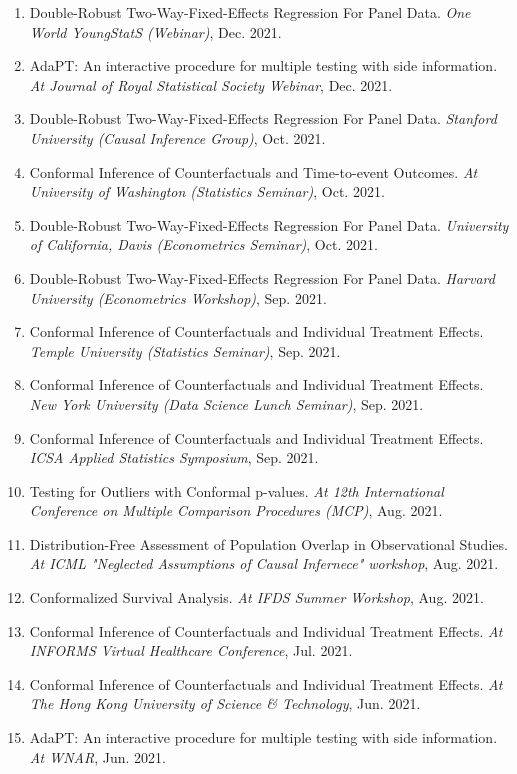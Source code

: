 \documentclass{article}
\begin{document}
\begin{enumerate}
\item Double-Robust Two-Way-Fixed-Effects Regression For Panel Data. \emph{One World YoungStatS (Webinar)}, Dec. 2021.
\item AdaPT: An interactive procedure for multiple testing with side information. \emph{At Journal of Royal Statistical Society Webinar}, Dec. 2021.
\item Double-Robust Two-Way-Fixed-Effects Regression For Panel Data. \emph{Stanford University (Causal Inference Group)}, Oct. 2021.
\item Conformal Inference of Counterfactuals and Time-to-event Outcomes. \emph{At University of Washington (Statistics Seminar)}, Oct. 2021.
\item Double-Robust Two-Way-Fixed-Effects Regression For Panel Data. \emph{University of California, Davis (Econometrics Seminar)}, Oct. 2021.
\item Double-Robust Two-Way-Fixed-Effects Regression For Panel Data. \emph{Harvard University (Econometrics Workshop)}, Sep. 2021.
\item Conformal Inference of Counterfactuals and Individual Treatment Effects. \emph{Temple University (Statistics Seminar)}, Sep. 2021.
\item Conformal Inference of Counterfactuals and Individual Treatment Effects. \emph{New York University (Data Science Lunch Seminar)}, Sep. 2021.
\item Conformal Inference of Counterfactuals and Individual Treatment Effects. \emph{ICSA Applied Statistics Symposium}, Sep. 2021.
\item Testing for Outliers with Conformal p-values. \emph{At 12th International Conference on Multiple Comparison Procedures (MCP)}, Aug. 2021.
\item Distribution-Free Assessment of Population Overlap in Observational Studies. \emph{At ICML "Neglected Assumptions of Causal Infernece" workshop}, Aug. 2021.
\item Conformalized Survival Analysis. \emph{At IFDS Summer Workshop}, Aug. 2021.
\item Conformal Inference of Counterfactuals and Individual Treatment Effects. \emph{At INFORMS Virtual Healthcare Conference}, Jul. 2021.
\item Conformal Inference of Counterfactuals and Individual Treatment Effects. \emph{At The Hong Kong University of Science \& Technology}, Jun. 2021.
\item AdaPT: An interactive procedure for multiple testing with side information. \emph{At WNAR}, Jun. 2021.

\end{enumerate}
\end{document}
